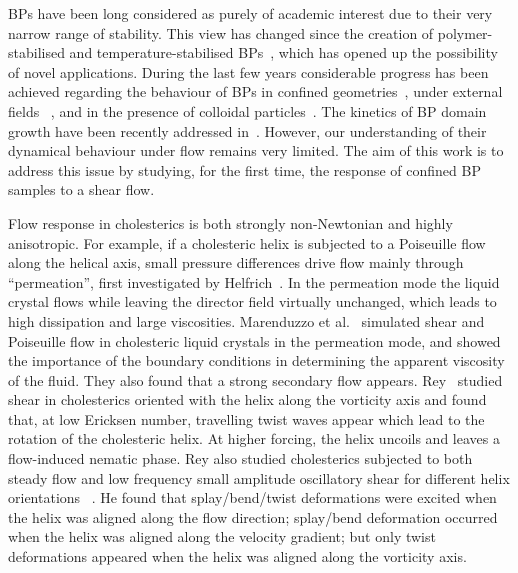 \documentclass[aps,pre,reprint,superscriptaddress]{revtex4}
\begin{document}
BPs have been long considered as purely of academic interest due to their very narrow 
range of stability. This view has changed since the creation of polymer-stabilised and 
temperature-stabilised BPs~\cite{Kikuchi:2002,Coles:2005}, which has opened up the 
possibility of novel applications.
During the last few years considerable progress has been achieved regarding the behaviour 
of BPs in confined geometries~\cite{Fukuda:2010a, Fukuda:2010b, Ravnik:2011b}, under 
external fields ~\cite{Alexander:2008,Fukuda:2009,Henrich:2010a,Castles:2010,Tiribocchi:2011a}, 
and in the presence of colloidal particles~\cite{Ravnik:2011a}.
The kinetics of BP domain growth have been recently addressed in~\cite{Henrich:2010b}. 
However, our understanding of their dynamical behaviour under flow remains
very limited. The aim of this work is to address this issue by studying,
for the first time, the response of confined BP samples to a shear flow.

Flow response in cholesterics is both strongly non-Newtonian and highly anisotropic.
For example, if a cholesteric helix is subjected to a Poiseuille flow along
the helical axis, small pressure differences drive flow mainly through
``permeation'', first investigated by Helfrich~\cite{Helfrich:1969}.
In the permeation mode the liquid crystal flows while leaving the director
field virtually unchanged, which leads to high dissipation and large
viscosities. Marenduzzo et al.~\cite{Marenduzzo:2006a,Marenduzzo:2006b} simulated 
shear and Poiseuille flow in cholesteric liquid crystals in the permeation mode, and 
showed the importance of the boundary conditions in determining the apparent viscosity of the fluid. 
They also found that a strong secondary flow appears.
Rey~\cite{Rey:1996a, Rey:1996b} studied shear in cholesterics oriented with the helix along 
the vorticity axis and found that, at low Ericksen number, travelling twist waves appear which 
lead to the rotation of the cholesteric helix. At higher forcing, the helix uncoils and 
leaves a flow-induced nematic phase.
Rey also studied cholesterics subjected to both steady flow and low frequency
small amplitude oscillatory shear for different helix orientations
~\cite{Rey:2000, Rey:2002}. He found that splay/bend/twist deformations were
excited when the helix was aligned along the flow direction; splay/bend
deformation occurred when the helix was aligned along the velocity gradient;
but only twist deformations
appeared when the helix was aligned along the vorticity axis.
\end{document}
